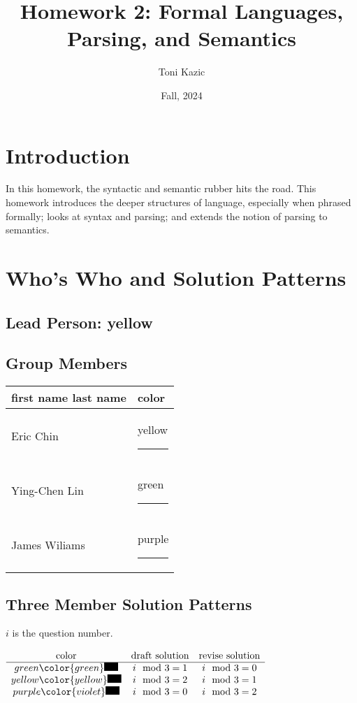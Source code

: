 \documentclass[11pt]{article}
\author{Toni Kazic}
\date{Fall, 2024}
\title{Homework 2: Formal Languages, Parsing, and Semantics}
\begin{document}
\maketitle
\section{Introduction}
\label{sec:org1afeaa0}

In this homework, the syntactic and semantic rubber hits the road.  This
homework introduces the deeper structures of language, especially when
phrased formally; looks at syntax and parsing; and extends the notion of
parsing to semantics.
\section{Who's Who and Solution Patterns}
\label{sec:org7bc4000}
\label{whoswho}
\subsection{Lead Person:  yellow}
\label{sec:orgeea034d}


\subsection{Group Members}
\label{sec:org37e8cf2}

\begin{center}
\begin{tabular}{ll}
first name last name & color\\
\hline
Eric Chin & yellow \color{yellow}\rule{5mm}{3mm}\\
Ying-Chen Lin & green \color{green}\rule{5mm}{3mm}\\
James Wiliams & purple \color{violet}\rule{5mm}{3mm}\\
\end{tabular}
\end{center}
\subsection{Three Member Solution Patterns}
\label{sec:org2f474c7}

\(i\) is the question number.

\begin{center}
\(\begin{array}{ccc}
 \text{color} & \text{draft solution} & \text{revise solution} \\
\hline green \color{green}\rule{5mm}{3mm} & i \mod 3 = 1 & i \mod 3 = 0 \\
 yellow \color{yellow}\rule{5mm}{3mm} & i \mod 3 = 2 & i \mod 3 = 1 \\
 purple \color{violet}\rule{5mm}{3mm} & i \mod 3 = 0 & i \mod 3 = 2 \\
\end{array}
\)
\end{center}
\end{document}
